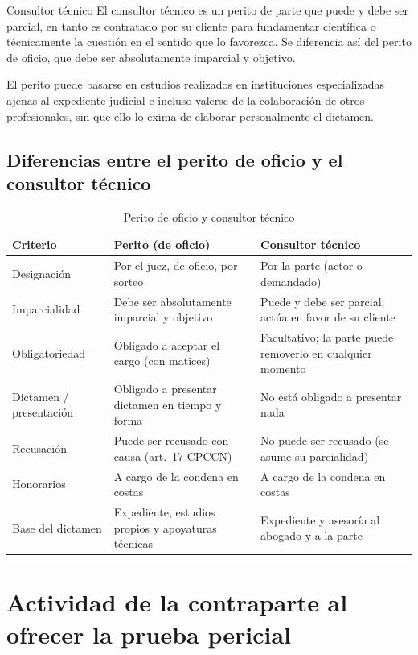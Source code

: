 \documentclass[12pt,oneside]{book}
\begin{document}
\begin{definition}{Consultor técnico}
El consultor técnico es un perito de parte que puede y debe ser parcial, en tanto es contratado por su cliente para fundamentar científica o técnicamente la cuestión en el sentido que lo favorezca. Se diferencia así del perito de oficio, que debe ser absolutamente imparcial y objetivo.
\end{definition}

El perito puede basarse en estudios realizados en instituciones especializadas ajenas al expediente judicial e incluso valerse de la colaboración de otros profesionales, sin que ello lo exima de elaborar personalmente el dictamen.

\subsection{Diferencias entre el perito de oficio y el consultor técnico}

\begin{table}[H]
\centering
\small
\begin{tabularx}{\textwidth}{>{\raggedright\arraybackslash}p{} X X}
\toprule
\textbf{Criterio} & \textbf{Perito (de oficio)} & \textbf{Consultor técnico} \\
\midrule
Designación & Por el juez, de oficio, por sorteo & Por la parte (actor o demandado) \\
Imparcialidad & Debe ser absolutamente imparcial y objetivo & Puede y debe ser parcial; actúa en favor de su cliente \\
Obligatoriedad & Obligado a aceptar el cargo (con matices) & Facultativo; la parte puede removerlo en cualquier momento \\
Dictamen / presentación & Obligado a presentar dictamen en tiempo y forma & No está obligado a presentar nada \\
Recusación & Puede ser recusado con causa (art.\ 17 CPCCN) & No puede ser recusado (se asume su parcialidad) \\
Honorarios & A cargo de la condena en costas & A cargo de la condena en costas \\
Base del dictamen & Expediente, estudios propios y apoyaturas técnicas & Expediente y asesoría al abogado y a la parte \\
\bottomrule
\end{tabularx}
\caption{Perito de oficio y consultor técnico}
\end{table}

\section{Actividad de la contraparte al ofrecer la prueba pericial}
\end{document}
